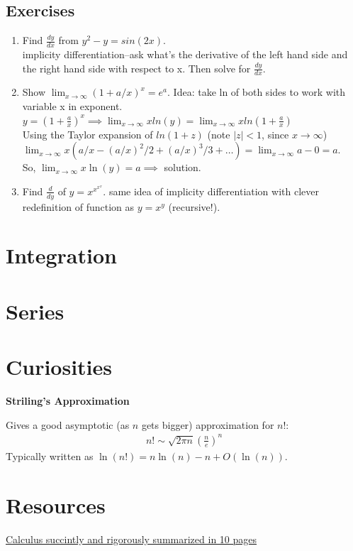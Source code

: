 \documentclass[a4paper, 12pt]{article}
\newcommand{\bt}[1]{\textbf{#1}} %
\newcommand{\eq}[1]{\begin{align*}#1\end{align*}} %
\renewcommand{\eq}[1]{\begin{align*}#1\end{align*}} %
\newcommand{\green}[1]{\textcolor{javagreen}{#1}} %
\newcommand{\gray}[1]{\textcolor[gray]{0.5}{#1}} %
\begin{document}
\subsection*{\green{Exercises}}
\begin{enumerate}
    \item Find $\frac{dy}{dx}$ from $y^2 - y = sin(2x)$.\\
    \gray{implicity differentiation--ask what's the derivative of the left hand side and the right hand side with respect to x. Then solve for $\frac{dy}{dx}$.}
    \item Show $\lim_{x \rightarrow \infty} (1 + a/x)^x = e^a$.
    \gray{Idea: take ln of both sides to work with variable x in exponent. \\
    $ y = (1 + \frac{a}{x})^x \implies \lim_{x \rightarrow \infty} 
    x ln(y) = \lim_{x \rightarrow \infty} x ln(1 + \frac{a}{x})$ \\
    Using the Taylor expansion of $ln(1 + z)$ (note $|z| < 1$, since $x \rightarrow
    \infty$)\\
    $\lim_{x \rightarrow \infty} x(a/x - (a/x)^2 / 2 + (a/x)^3 / 3 + \dots)
    = \lim_{x \rightarrow \infty} a - 0 = a.$\\
    So, $\lim_{x \rightarrow \infty} x \ln(y) = a \implies$ solution.
    }
    \item Find $\frac{d}{dy}$ of $y = x^{x^{x^{x}}}$.
    \gray{same idea of implicity differentiation with clever redefinition of
    function as $y = x^y$ (recursive!).
    }
\end{enumerate}


\section{Integration}

\section{Series}

\section*{Curiosities}

\bt{Striling's Approximation}

Gives a good asymptotic (as $n$ gets bigger) approximation for $n!$:\\

\eq{
n! \sim \sqrt{2\pi n} (\frac{n}{e})^n
}
Typically written as $\ln(n!) = n\ln(n) - n + O(\ln(n))$. 



\section*{Resources}
\href{http://cr.yp.to/papers/calculus.pdf}{Calculus succintly and rigorously summarized in 10 pages}
\end{document}

